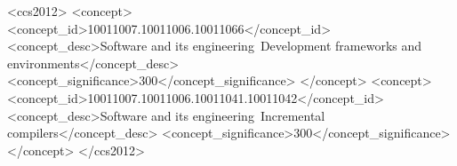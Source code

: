 \begin{CCSXML}
<ccs2012>
   <concept>
       <concept_id>10011007.10011006.10011066</concept_id>
       <concept_desc>Software and its engineering~Development frameworks and environments</concept_desc>
       <concept_significance>300</concept_significance>
       </concept>
   <concept>
       <concept_id>10011007.10011006.10011041.10011042</concept_id>
       <concept_desc>Software and its engineering~Incremental compilers</concept_desc>
       <concept_significance>300</concept_significance>
       </concept>
 </ccs2012>
\end{CCSXML}


